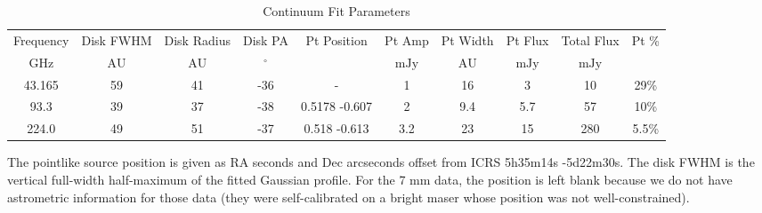 \begin{table*}[htp]
\centering
\caption{Continuum Fit Parameters}
\begin{tabular}{cccccccccc}
\label{tab:continuum_fit_parameters}
Frequency & Disk FWHM & Disk Radius & Disk PA & Pt Position & Pt Amp & Pt Width & Pt Flux & Total Flux & Pt \% \\
$\mathrm{GHz}$ & $\mathrm{AU}$ & $\mathrm{AU}$ & $\mathrm{{}^{\circ}}$ &  & $\mathrm{mJy}$ & $\mathrm{AU}$ & $\mathrm{mJy}$ & $\mathrm{mJy}$ & $\mathrm{}$ \\
\hline
43.165 & 59 & 41 & -36 & - & 1 & 16 & 3 & 10 & 29\% \\
93.3 & 39 & 37 & -38 & 0.5178 -0.607 & 2 & 9.4 & 5.7 & 57 & 10\% \\
224.0 & 49 & 51 & -37 & 0.518 -0.613 & 3.2 & 23 & 15 & 280 & 5.5\% \\
\hline
\end{tabular}

\par The pointlike source position is given as RA seconds and Dec arcseconds offset from ICRS 5h35m14s -5d22m30s.   The disk FWHM is the vertical full-width half-maximum of the fitted Gaussian profile.  For the 7 mm data, the position is left blank because we do not have astrometric information for those data (they were self-calibrated on a bright maser whose position was not well-constrained).
\end{table*}

